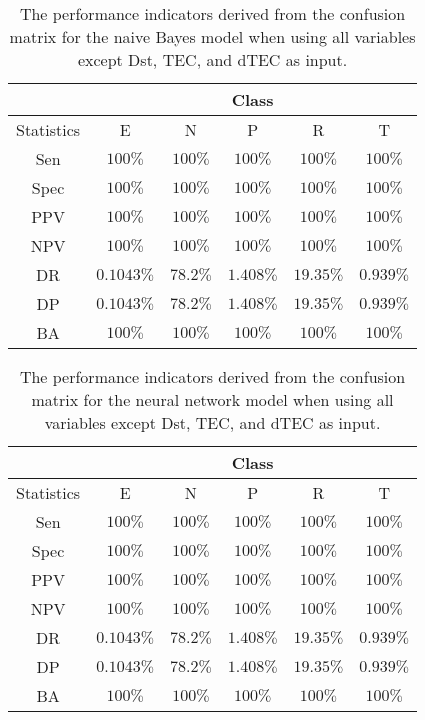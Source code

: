 \begin{table}[!ht]
	\centering
	\begin{tabular}{|c|c|c|c|c|c|}
		\hline
		 & \multicolumn{5}{c|}{Class} \\ \hline
		Statistics & E & N & P & R & T \\ \hline
		Sen & $100\%$ & $100\%$ & $100\%$ & $100\%$ & $100\%$ \\ \hline
		Spec & $100\%$ & $100\%$ & $100\%$ & $100\%$ & $100\%$ \\ \hline
		PPV & $100\%$ & $100\%$ & $100\%$ & $100\%$ & $100\%$ \\ \hline
		NPV & $100\%$ & $100\%$ & $100\%$ & $100\%$ & $100\%$ \\ \hline
		DR & $0.1043\%$ & $78.2\%$ & $1.408\%$ & $19.35\%$ & $0.939\%$ \\ \hline
		DP & $0.1043\%$ & $78.2\%$ & $1.408\%$ & $19.35\%$ & $0.939\%$ \\ \hline
		BA & $100\%$ & $100\%$ & $100\%$ & $100\%$ & $100\%$ \\ \hline
	\end{tabular}
	\caption{The performance indicators derived from the confusion matrix for the naive Bayes model when using all variables except Dst, TEC, and dTEC as input.}
	\label{tab:cs:reverse:noTEC:nb}
\end{table}

\begin{table}[!ht]
	\centering
	\begin{tabular}{|c|c|c|c|c|c|}
		\hline
		 & \multicolumn{5}{c|}{Class} \\ \hline
		Statistics & E & N & P & R & T \\ \hline
		Sen & $100\%$ & $100\%$ & $100\%$ & $100\%$ & $100\%$ \\ \hline
		Spec & $100\%$ & $100\%$ & $100\%$ & $100\%$ & $100\%$ \\ \hline
		PPV & $100\%$ & $100\%$ & $100\%$ & $100\%$ & $100\%$ \\ \hline
		NPV & $100\%$ & $100\%$ & $100\%$ & $100\%$ & $100\%$ \\ \hline
		DR & $0.1043\%$ & $78.2\%$ & $1.408\%$ & $19.35\%$ & $0.939\%$ \\ \hline
		DP & $0.1043\%$ & $78.2\%$ & $1.408\%$ & $19.35\%$ & $0.939\%$ \\ \hline
		BA & $100\%$ & $100\%$ & $100\%$ & $100\%$ & $100\%$ \\ \hline
	\end{tabular}
	\caption{The performance indicators derived from the confusion matrix for the neural network model when using all variables except Dst, TEC, and dTEC as input.}
	\label{tab:cs:reverse:noTEC:nnet}
\end{table}

